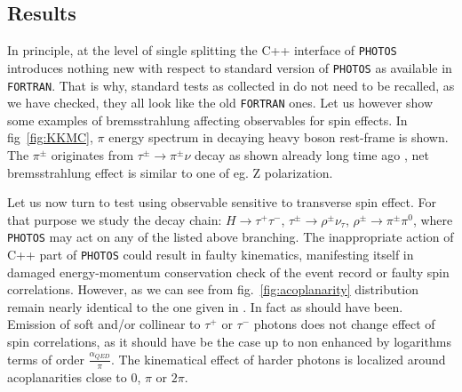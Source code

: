 \documentclass[]{Photos_interface_design}
\begin{document}
\subsection{Results}
\label{sec:results}
In principle, at the level of single splitting the C++ interface of {\tt PHOTOS}
introduces nothing new with respect to standard version of {\tt PHOTOS} as available 
in {\tt FORTRAN}. That is why, standard tests as collected in \cite{Photos_tests} do not need 
to be recalled, as we have checked, they all look like the old {\tt FORTRAN} ones.
Let us however show some examples of bremsstrahlung affecting observables
for spin effects. In  fig~\ref{fig:KKMC}, $\pi$ energy spectrum in decaying
heavy boson rest-frame is shown. The $\pi^\pm$ originates from $\tau^\pm \to \pi^\pm \nu $ decay as shown already long time ago \cite{Boillot:1988re}, net
bremsstrahlung  effect is similar 
to one of eg. Z polarization.

Let us now turn to test using observable sensitive to transverse spin effect.
 For that purpose we study the decay chain:
$H\to \tau^+\tau^-$, $\tau^\pm \to \rho^\pm \nu_\tau$, 
$\rho^\pm \to \pi^\pm \pi^0$, where {\tt PHOTOS} may act on any of the listed above branching. The inappropriate action of C++ part of {\tt PHOTOS} could result in faulty
kinematics, manifesting itself in damaged energy-momentum conservation check of the event record or faulty spin correlations. However, as we can see from 
fig.~\ref{fig:acoplanarity} distribution remain nearly identical to the 
one given in \cite{tauolaC++}. In fact as should have been. Emission of soft
and/or collinear to $\tau^+$ or $\tau^-$ photons does not change effect of 
spin correlations, as it should have be the case up to non enhanced by logarithms terms of order $\frac{\alpha_{QED}}{\pi}$. The kinematical effect of harder 
photons is localized around acoplanarities close to $0$, $\pi$ or $2\pi$. 
\end{document}

